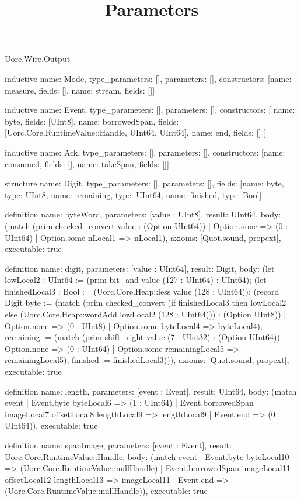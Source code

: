 \begin{lexlean}{Uorc.Wire.Output}
\title{Parameters}
\begin{semanticmodule}
inductive{
  name: Mode,
  type_parameters: [],
  parameters: [],
  constructors: [{name: measure, fields: []}, {name: stream, fields: []}]
}

inductive{
  name: Event,
  type_parameters: [],
  parameters: [],
  constructors: [
    {name: byte, fields: [UInt8]},
    {name: borrowedSpan, fields: [Uorc.Core.RuntimeValue::Handle, UInt64, UInt64]},
    {name: end, fields: []}
  ]
}

inductive{
  name: Ack,
  type_parameters: [],
  parameters: [],
  constructors: [{name: consumed, fields: []}, {name: takeSpan, fields: []}]
}

structure{
  name: Digit,
  type_parameters: [],
  parameters: [],
  fields: [{name: byte, type: UInt8}, {name: remaining, type: UInt64}, {name: finished, type: Bool}]
}

definition{
  name: byteWord,
  parameters: [value : UInt8],
  result: UInt64,
  body: (match (prim checked_convert value : (Option UInt64))
    | Option.none => (0 : UInt64)
    | Option.some nLocal1 => nLocal1),
  axioms: [Quot.sound, propext],
  executable: true
}

definition{
  name: digit,
  parameters: [value : UInt64],
  result: Digit,
  body: (let lowLocal2 : UInt64 := (prim bit_and value (127 : UInt64) : UInt64); (let finishedLocal3 : Bool := (Uorc.Core.Heap::less value (128 : UInt64)); (record Digit {byte := (match (prim checked_convert (if finishedLocal3 then lowLocal2 else (Uorc.Core.Heap::wordAdd lowLocal2 (128 : UInt64))) : (Option UInt8))
    | Option.none => (0 : UInt8)
    | Option.some byteLocal4 => byteLocal4), remaining := (match (prim shift_right value (7 : UInt32) : (Option UInt64))
    | Option.none => (0 : UInt64)
    | Option.some remainingLocal5 => remainingLocal5), finished := finishedLocal3}))),
  axioms: [Quot.sound, propext],
  executable: true
}

definition{
  name: length,
  parameters: [event : Event],
  result: UInt64,
  body: (match event
    | Event.byte byteLocal6 => (1 : UInt64)
    | Event.borrowedSpan imageLocal7 offsetLocal8 lengthLocal9 => lengthLocal9
    | Event.end => (0 : UInt64)),
  executable: true
}

definition{
  name: spanImage,
  parameters: [event : Event],
  result: Uorc.Core.RuntimeValue::Handle,
  body: (match event
    | Event.byte byteLocal10 => (Uorc.Core.RuntimeValue::nullHandle)
    | Event.borrowedSpan imageLocal11 offsetLocal12 lengthLocal13 => imageLocal11
    | Event.end => (Uorc.Core.RuntimeValue::nullHandle)),
  executable: true
}
\end{semanticmodule}
\end{lexlean}
